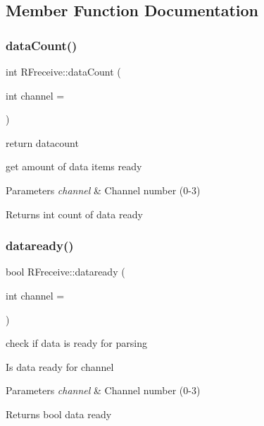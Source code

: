 \subsection{Member Function Documentation}
\mbox{\label{class_r_freceive_af36972eab4c5f65cb96ee4e4742235fb}} 
\subsubsection{\texorpdfstring{data\+Count()}{dataCount()}}
{\footnotesize\ttfamily int R\+Freceive\+::data\+Count (\begin{DoxyParamCaption}\item[{int}]{channel = {} }\end{DoxyParamCaption})}



return datacount 

get amount of data items ready 
\begin{DoxyParams}{Parameters}
{\em channel} & Channel number (0-\/3) \\
\hline
\end{DoxyParams}
\begin{DoxyReturn}{Returns}
int count of data ready 
\end{DoxyReturn}
\mbox{\label{class_r_freceive_a2d3c05696fabff62bdc06e1feedadc48}} 
\subsubsection{\texorpdfstring{dataready()}{dataready()}}
{\footnotesize\ttfamily bool R\+Freceive\+::dataready (\begin{DoxyParamCaption}\item[{int}]{channel = {} }\end{DoxyParamCaption})}



check if data is ready for parsing 

Is data ready for channel 
\begin{DoxyParams}{Parameters}
{\em channel} & Channel number (0-\/3) \\
\hline
\end{DoxyParams}
\begin{DoxyReturn}{Returns}
bool data ready 
\end{DoxyReturn}
\mbox{\label{class_r_freceive_ab8b545efe94b82be8d1feef08c29340d}} 
